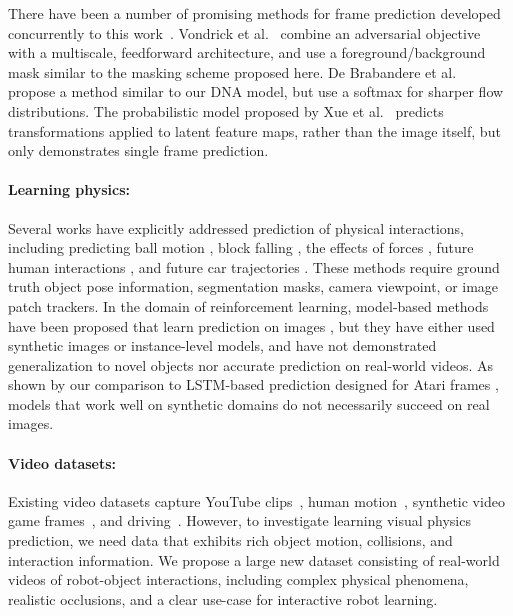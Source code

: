 \documentclass{article}
\newcommand{\atari}{acvpa-oglls-15}
\begin{document}
There have been a number of promising methods for frame prediction developed concurrently to this work~\cite{lkc-dpcn-16}.
Vondrick et al.~\cite{vpt-gcsd-16} combine an adversarial objective with a multiscale, feedforward architecture, and use a foreground/background mask similar
to the masking scheme proposed here.
De Brabandere et al.~\cite{djtv-dfn-16} propose a method similar to our DNA model, but use a softmax for sharper flow distributions.
The probabilistic model proposed by Xue et al.~\cite{xwbf-vd-16} predicts transformations applied to latent feature maps, rather than the image itself, but only demonstrates
single frame prediction.

\vspace{-0.07in}
\paragraph{Learning physics:} Several works have explicitly addressed prediction of physical interactions, including
predicting ball motion \cite{bsf-ecd-09}, block falling \cite{bht-sepse-13},
the effects of forces
\cite{mrgf-whi-16,mbrf-niu-15}, future human interactions \cite{hk-ar-14}, and future car trajectories \cite{wgh-pttf-14}. These methods require ground truth object pose information, segmentation masks, camera viewpoint, or image patch trackers. In the domain of reinforcement learning, model-based methods have been proposed that learn prediction on images \cite{lrv-arl-12,e2c-wsbr-15}, but they have either used synthetic images or instance-level models, and have not demonstrated generalization to novel objects nor accurate prediction on real-world videos. As shown by our comparison to LSTM-based prediction designed for Atari frames \cite{acvpa-oglls-15}, models that work well on synthetic domains do not necessarily succeed on real images.



\vspace{-0.07in}
\paragraph{Video datasets:}
Existing video datasets capture YouTube clips~\cite{ktsls-lsvc-14}, human motion~\cite{ipos-h36m-14},
synthetic video game frames~\cite{\atari}, and driving~\cite{glsu-kitti-13}.
However, to investigate learning visual physics prediction,
we need data that exhibits rich object motion, collisions, and interaction information. We propose a large new dataset consisting of real-world
videos of robot-object interactions, including complex physical phenomena, realistic occlusions, and a clear use-case for interactive robot learning.
\end{document}
